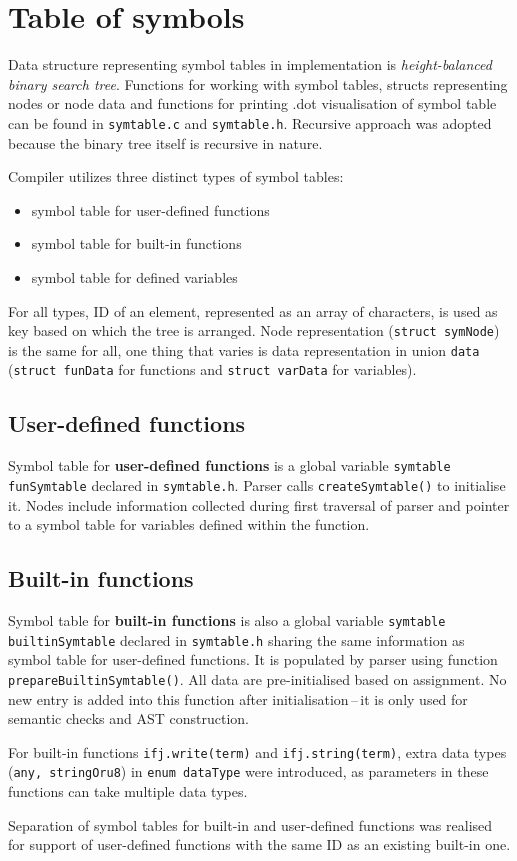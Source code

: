 \documentclass[a4paper, 11pt]{article}
\begin{document}
\section{Table of symbols}\label{sec:SYMTABLE}
Data structure representing symbol tables in implementation is \textit{height-balanced binary search tree}.
Functions for working with symbol tables, structs representing nodes or node data and functions for printing
.dot visualisation of symbol table can be found in \verb|symtable.c| and \verb|symtable.h|. Recursive approach was adopted because the binary tree itself is recursive in nature.
\par
Compiler utilizes three distinct types of symbol tables: 
\begin{itemize}
    \item symbol table for user-defined functions
    \item symbol table for built-in functions
    \item symbol table for defined variables
\end{itemize}
 For all types, ID of an element, represented as
an array of characters, is used as key based on which the tree is arranged. Node representation (\verb|struct symNode|) is the same for all, one thing that varies
is data representation in union \verb|data| (\verb|struct funData| for functions and \verb|struct varData| for variables).
\subsection{User-defined functions}
Symbol table for \textbf{user-defined functions} is a global variable \verb|symtable funSymtable| declared in \newline\verb|symtable.h|. Parser calls
\verb|createSymtable()| to initialise it. Nodes include information collected during first traversal of parser and pointer 
to a symbol table for variables defined within the function.
\subsection{Built-in functions}
Symbol table for \textbf{built-in functions} is also a global variable \verb|symtable builtinSymtable| declared in \verb|symtable.h| sharing
the same information as symbol table for user-defined functions. It is populated by parser using function \verb|prepareBuiltinSymtable()|.
All data are pre-initialised based on assignment. No new entry is added into this function after initialisation\,--\,it is only used
for semantic checks and AST construction. 
\par For built-in functions \verb|ifj.write(term)| and \verb|ifj.string(term)|, extra
data types (\verb|any, stringOru8|) in \verb|enum dataType| were introduced, as parameters in these functions can take multiple data types. 
\par Separation of symbol tables for built-in and user-defined functions was realised for support of user-defined functions with the same ID as an existing built-in one.
\end{document}
